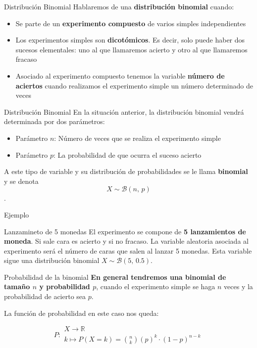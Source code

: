 \documentclass[11pt]{beamer}
\begin{document}
\begin{frame}{Distribución Binomial}
Hablaremos de una \textbf{distribución binomial} cuando:
\begin{itemize}[<+->]
\item Se parte de un \textbf{experimento compuesto} de varios simples independientes
\item Los experimentos simples son \textbf{dicotómicos}. Es decir, solo puede haber dos sucesos elementales: uno al que llamaremos acierto y otro al que llamaremos fracaso
\item Asociado al experimento compuesto tenemos la variable \textbf{número de aciertos} cuando realizamos el experimento simple un número determinado de veces
\end{itemize}
\end{frame}

\begin{frame}{Distribución Binomial}
En la situación anterior, la distribución binomial vendrá determinada por dos parámetros:
\begin{itemize}[<+->]
\item Parámetro $n$: Número de veces que se realiza el experimento simple 
\item Parámetro $p$: La probabilidad de que ocurra el suceso acierto
\end{itemize}
\pause

A este tipo de variable y su distribución de probabilidades se le llama \textbf{binomial} y se denota $$X \sim \mathcal{B}(n,\,p)$$.
\end{frame}

\begin{frame}{Ejemplo}
\begin{block}{Lanzamineto de 5 monedas} El experimento se compone de \textbf{5 lanzamientos de moneda}. Si sale cara es acierto y si no fracaso. La variable aleatoria asociada al experimento será el número de caras que salen al lanzar 5 monedas. Esta variable sigue una distribución binomial $X \sim \mathcal{B}(5,\,0.5)$.
\end{block}



\end{frame}

\begin{frame}{Probabilidad de la binomial}
\textbf{En general tendremos una binomial de tamaño $n$ y probabilidad $p$}, cuando el experimento simple se haga $n$ veces y la probabilidad de acierto sea $p$.

La función de probabilidad en este caso nos queda:

\begin{block}
 $$P\colon \begin{array}{l} 
          X \rightarrow \mathbb{R} \\ 
          k\mapsto P(X=k)=\binom{n}{k}\left(p\right)^k\cdot  \left(1-p\right)^{n-k} 
         \end{array}$$

\end{block} 
    
\end{frame}
\end{document}
